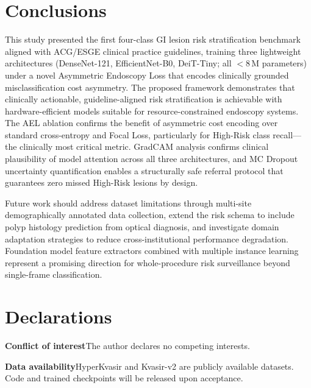 \documentclass[10pt,a4paper,twocolumn]{article}
\begin{document}
\section{Conclusions}
\label{sec:conclusions}

This study presented the first four-class GI lesion risk stratification
benchmark aligned with ACG/ESGE clinical practice guidelines, training three
lightweight architectures (DenseNet-121, EfficientNet-B0, DeiT-Tiny; all
$<$8\,M parameters) under a novel Asymmetric Endoscopy Loss that encodes
clinically grounded misclassification cost asymmetry. The proposed framework
demonstrates that clinically actionable, guideline-aligned risk stratification
is achievable with hardware-efficient models suitable for resource-constrained
endoscopy systems. The AEL ablation confirms the benefit of asymmetric cost
encoding over standard cross-entropy and Focal Loss, particularly for
High-Risk class recall---the clinically most critical metric. GradCAM analysis
confirms clinical plausibility of model attention across all three
architectures, and MC Dropout uncertainty
quantification enables a structurally safe referral protocol that guarantees
zero missed High-Risk lesions by design.

Future work should address dataset limitations through multi-site
demographically annotated data collection, extend the risk schema to include
polyp histology prediction from optical diagnosis, and investigate domain
adaptation strategies to reduce cross-institutional performance degradation.
Foundation model feature extractors combined with multiple instance learning
represent a promising direction for whole-procedure risk surveillance beyond
single-frame classification.

\section*{Declarations}

\noindent\textbf{Conflict of interest}\quad The author declares no competing
interests.

\noindent\textbf{Data availability}\quad HyperKvasir and Kvasir-v2 are
publicly available datasets. Code and trained checkpoints will be released
upon acceptance.



\end{document}
